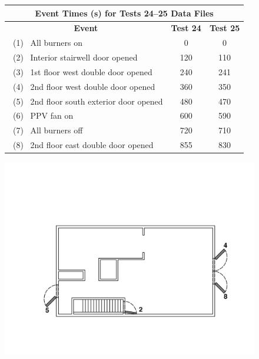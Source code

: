 \documentclass[12pt,oneside]{book}
\begin{document}
\begin{figure}[!ht]
\begin{minipage}[b]{0.8\columnwidth}
	\begin{flushleft}
	\begin{tabular}{lcc}
	\multicolumn{3}{c}{Event Times (s) for Tests 24--25 Data Files} \\
	\toprule
	\multicolumn{1}{c}{\textbf{Event}} 			& \textbf{Test 24}	& \textbf{Test 25} \\
	\midrule
	~(1)~ All burners on 						&   0		  		&	 0			\\
	~(2)~ Interior stairwell door opened 		&   120		  		&    110		\\
	~(3)~ 1st floor west double door opened 	&	240		  		&    241 	 	\\
	~(4)~ 2nd floor west double door opened 	&   360			  	&    350		\\
	~(5)~ 2nd floor south exterior door opened	&   480			  	&    470		\\
	~(6)~ PPV fan on 							&   600			  	&    590 		\\
	~(7)~ All burners off 						&   720 		  	&    710		\\
	~(8)~ 2nd floor east double door opened 	&   855			  	&    830		\\
	\bottomrule
	\end{tabular}
	\end{flushleft}
\end{minipage}
\begin{minipage}[b]{0.9\columnwidth}
	\vspace{15pt}
	\centering
	\includegraphics[width=\columnwidth]{../Figures/Floor_Plans/West_Structure_2nd_Floor_Test_24}

\end{minipage}
\end{figure}
\end{document}
